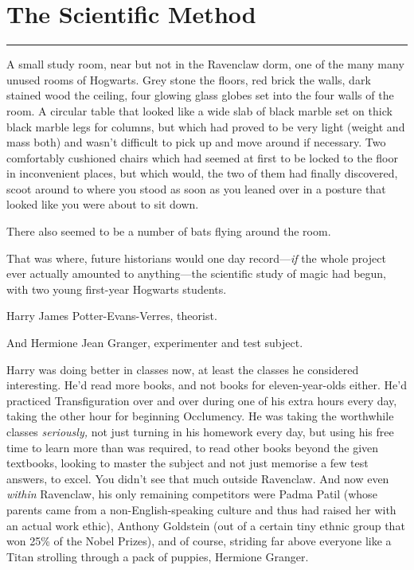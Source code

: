 \chapter{The Scientific Method}

\begin{center}\rule{3in}{0.4pt}\end{center}

A small study room, near but not in the Ravenclaw dorm, one of the many
many unused rooms of Hogwarts. Grey stone the floors, red brick the
walls, dark stained wood the ceiling, four glowing glass globes set into
the four walls of the room. A circular table that looked like a wide
slab of black marble set on thick black marble legs for columns, but
which had proved to be very light (weight and mass both) and wasn't
difficult to pick up and move around if necessary. Two comfortably
cushioned chairs which had seemed at first to be locked to the floor in
inconvenient places, but which would, the two of them had finally
discovered, scoot around to where you stood as soon as you leaned over
in a posture that looked like you were about to sit down.

There also seemed to be a number of bats flying around the room.

That was where, future historians would one day record---\emph{if} the
whole project ever actually amounted to anything---the scientific study
of magic had begun, with two young first-year Hogwarts students.

Harry James Potter-Evans-Verres, theorist.

And Hermione Jean Granger, experimenter and test subject.

Harry was doing better in classes now, at least the classes he
considered interesting. He'd read more books, and not books for
eleven-year-olds either. He'd practiced Transfiguration over and over
during one of his extra hours every day, taking the other hour for
beginning Occlumency. He was taking the worthwhile classes
\emph{seriously,} not just turning in his homework every day, but using
his free time to learn more than was required, to read other books
beyond the given textbooks, looking to master the subject and not just
memorise a few test answers, to excel. You didn't see that much outside
Ravenclaw. And now even \emph{within} Ravenclaw, his only remaining
competitors were Padma Patil (whose parents came from a
non-English-speaking culture and thus had raised her with an actual work
ethic), Anthony Goldstein (out of a certain tiny ethnic group that won
25\% of the Nobel Prizes), and of course, striding far above everyone
like a Titan strolling through a pack of puppies, Hermione Granger.

